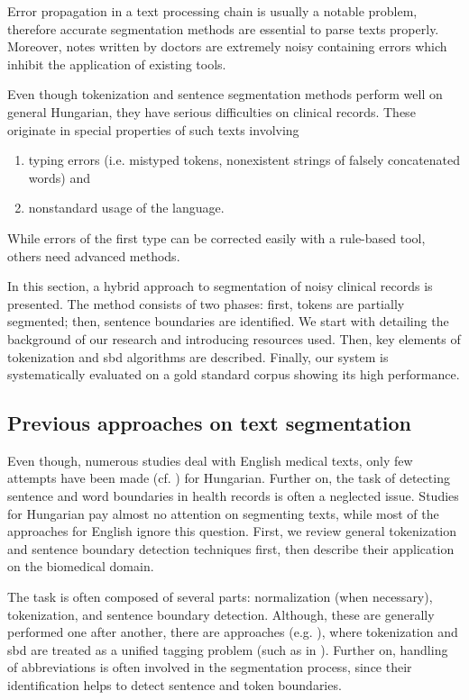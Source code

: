 Error propagation in a text processing chain is usually a notable problem, therefore accurate segmentation methods are essential to parse texts properly.
Moreover, notes written by doctors are extremely noisy containing errors which inhibit the application of existing tools.

Even though tokenization and sentence segmentation methods perform well on general Hungarian, they have serious difficulties on clinical records.
These originate in special properties of such texts involving
\begin{enumerate} %
 \item typing errors (i.e. mistyped tokens, nonexistent strings of falsely concatenated words) and
 \item nonstandard usage of the language.
\end{enumerate}
While errors of the first type can be corrected easily with a rule-based tool, others need advanced methods. 

In this section, a hybrid approach to segmentation of noisy clinical records is presented. 
The method consists of two phases: first, tokens are partially segmented; then, sentence boundaries are identified.
We start with detailing the background of our research and introducing resources used.
Then, key elements of tokenization and \gls{sbd} algorithms are described. 
Finally, our system is systematically evaluated on a gold standard corpus showing its high performance.

\subsection{Previous approaches on text segmentation}

Even though, numerous studies deal with English medical texts, only few attempts have been made (cf. \cite{Siklosi2012,Siklosi2013,Siklosi2013b}) for Hungarian. 
Further on, the task of detecting sentence and word boundaries in health records is often a neglected issue.
Studies for Hungarian pay almost no attention on segmenting texts, while
most of the approaches for English ignore this question. 
First, we review general tokenization and sentence boundary detection techniques first, then describe their application on the biomedical domain.

The task is often composed of several parts: normalization (when necessary), tokenization, and sentence boundary detection.  
Although, these are generally performed one after another, there are approaches (e.g. \cite{zhu2007unified}), where tokenization and \acrshort{sbd} are treated as a unified tagging problem (such as in \cite{mikheev2000tagging}). 
Further on, handling of abbreviations is often involved in the segmentation process, since their identification helps to detect sentence and token boundaries.


